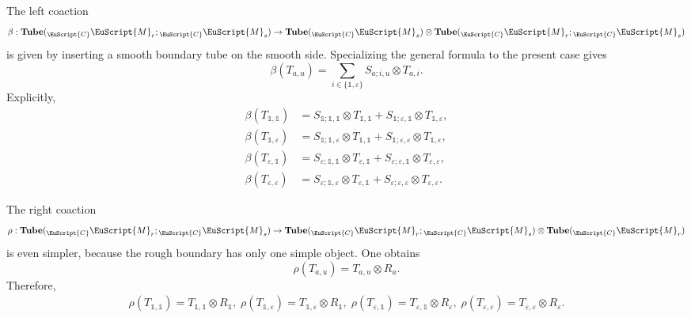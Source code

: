 \documentclass[a4paper,11pt]{article}
\theoremstyle{definition}
\theoremstyle{remark}
\newcommand\eC           {\EuScript{C}}
\newcommand\eM          {\EuScript{M}}
\begin{document}
The left coaction
\begin{equation}
    \beta:\mathbf{Tube}({}_\eC\eM_r;{}_\eC\eM_s)
    \to
    \mathbf{Tube}({}_\eC\eM_s)\otimes \mathbf{Tube}({}_\eC\eM_r;{}_\eC\eM_s)
\end{equation}
is given by inserting a smooth boundary tube on the smooth side. Specializing the general
formula to the present case gives
\begin{equation}
    \beta(T_{a,u})
    =
    \sum_{i\in\{\mathbb{1},\varepsilon\}}
    S_{a;i,u}\otimes T_{a,i}.
\end{equation}
Explicitly,
\begin{equation}
\begin{aligned}
    \beta(T_{\mathbb{1},\mathbb{1}})
    &=
    S_{\mathbb{1};\mathbb{1},\mathbb{1}}\otimes T_{\mathbb{1},\mathbb{1}}
    +
    S_{\mathbb{1};\varepsilon,\mathbb{1}}\otimes T_{\mathbb{1},\varepsilon},\\
    \beta(T_{\mathbb{1},\varepsilon})
    &=
    S_{\mathbb{1};\mathbb{1},\varepsilon}\otimes T_{\mathbb{1},\mathbb{1}}
    +
    S_{\mathbb{1};\varepsilon,\varepsilon}\otimes T_{\mathbb{1},\varepsilon},\\
    \beta(T_{\varepsilon,\mathbb{1}})
    &=
    S_{\varepsilon;\mathbb{1},\mathbb{1}}\otimes T_{\varepsilon,\mathbb{1}}
    +
    S_{\varepsilon;\varepsilon,\mathbb{1}}\otimes T_{\varepsilon,\varepsilon},\\
    \beta(T_{\varepsilon,\varepsilon})
    &=
    S_{\varepsilon;\mathbb{1},\varepsilon}\otimes T_{\varepsilon,\mathbb{1}}
    +
    S_{\varepsilon;\varepsilon,\varepsilon}\otimes T_{\varepsilon,\varepsilon}.
\end{aligned}
\end{equation}

The right coaction
\begin{equation}
    \rho:\mathbf{Tube}({}_\eC\eM_r;{}_\eC\eM_s)
    \to
    \mathbf{Tube}({}_\eC\eM_r;{}_\eC\eM_s)\otimes \mathbf{Tube}({}_\eC\eM_r)
\end{equation}
is even simpler, because the rough boundary has only one simple object. One obtains
\begin{equation}
    \rho(T_{a,u})=T_{a,u}\otimes R_a.
\end{equation}
Therefore,
\begin{equation}
\begin{aligned}
    \rho(T_{\mathbb{1},\mathbb{1}})
    =T_{\mathbb{1},\mathbb{1}}\otimes R_{\mathbb{1}},\;
    \rho(T_{\mathbb{1},\varepsilon})
    =T_{\mathbb{1},\varepsilon}\otimes R_{\mathbb{1}},\;
    \rho(T_{\varepsilon,\mathbb{1}})
    =T_{\varepsilon,\mathbb{1}}\otimes R_{\varepsilon},\;
    \rho(T_{\varepsilon,\varepsilon})
    =T_{\varepsilon,\varepsilon}\otimes R_{\varepsilon}.
\end{aligned}
\end{equation}
\end{document}
